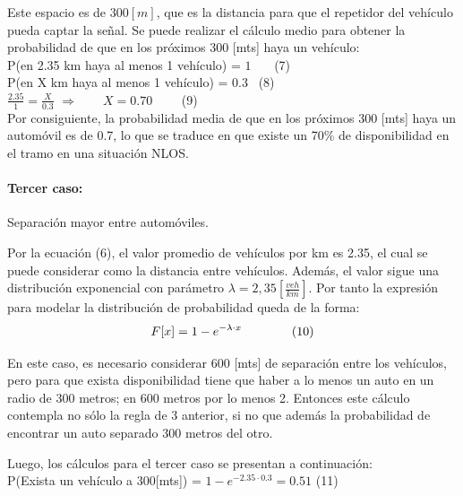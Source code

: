 \documentclass[12pt]{article}
\begin{document}
Este espacio es de $300[m]$, que es la distancia para que el repetidor del vehículo pueda captar la señal. 
Se puede realizar el cálculo medio para obtener la probabilidad de que en los próximos 300 [mts] haya un 
vehículo:\\

P(en 2.35 km haya al menos 1 vehículo) = $1$ \qquad \ \ \ \qquad \footnotesize (7) \normalsize\\            

P(en X km haya al menos 1 vehículo) = $0.3$ \qquad \quad \ \qquad \footnotesize (8) \normalsize \\        

\Large $\frac{2.35}{1} = \frac{X}{0.3}$ \normalsize \qquad $\Rightarrow \qquad X = 0.70$
\qquad \ \qquad \ \qquad \ \qquad \ \footnotesize (9) \normalsize\\

Por consiguiente, la probabilidad media de que en los próximos 300 [mts] haya un automóvil es de 0.7, 
lo que se traduce en que existe un 70\% de disponibilidad en el tramo en una situación NLOS.\\
\paragraph{Tercer caso:} Separación mayor entre automóviles.

Por la ecuación (6), el valor promedio de vehículos por km es 2.35, el cual se puede considerar como 
la distancia entre vehículos. Además, el valor sigue una distribución exponencial con parámetro 
$\lambda=2,35 [\frac{veh}{km}]$. Por tanto la expresión para modelar la distribución de probabilidad queda 
de la forma:
$$ F[x]= 1-e^{-\lambda \cdot x} \qquad \qquad  \tiny (10)$$

En este caso, es necesario considerar 600 [mts] de separación entre los vehículos, pero para que exista 
disponibilidad tiene que haber a lo menos un auto en un radio de 300 metros; en 600 metros por lo menos 2.
Entonces este cálculo contempla no sólo la regla de 3 anterior, si no que además la probabilidad de 
encontrar un auto separado 300 metros del otro.

Luego, los cálculos para el tercer caso se presentan a continuación:\\

P(Exista un vehículo a 300[mts]) = $1-e^{-2.35 \cdot 0.3} = 0.51$ \qquad \qquad \qquad
\footnotesize (11) \normalsize \\
\end{document}
